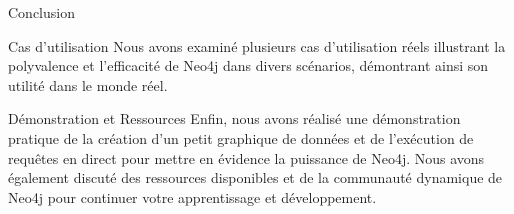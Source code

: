 \begin{frame}{Conclusion }
  \begin{block}{Cas d'utilisation}
    Nous avons examiné plusieurs cas d'utilisation réels illustrant la polyvalence et l'efficacité de Neo4j dans divers scénarios, démontrant ainsi son utilité dans le monde réel.
  \end{block}
  
  \begin{block}{Démonstration et Ressources}
    Enfin, nous avons réalisé une démonstration pratique de la création d'un petit graphique de données et de l'exécution de requêtes en direct pour mettre en évidence la puissance de Neo4j. Nous avons également discuté des ressources disponibles et de la communauté dynamique de Neo4j pour continuer votre apprentissage et développement.
  \end{block}
\end{frame}